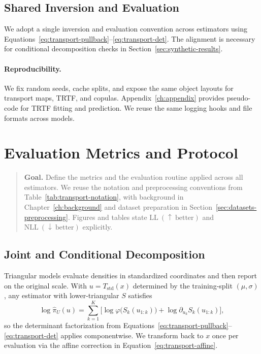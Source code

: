 \documentclass[11pt,a4paper,twoside]{book}\usepackage[]{graphicx}\usepackage[]{xcolor}
\begin{document}
\subsection{Shared Inversion and Evaluation}

We adopt a single inversion and evaluation convention across estimators using Equations~\eqref{eq:transport-pullback}--\eqref{eq:transport-det}. The alignment is necessary for conditional decomposition checks in Section~\ref{sec:synthetic-results}.

\paragraph{Reproducibility.} We fix random seeds, cache splits, and expose the same object layouts for transport maps, TRTF, and copulas. Appendix~\ref{ch:appendix} provides pseudo-code for TRTF fitting and prediction. We reuse the same logging hooks and file formats across models.
\section{Evaluation Metrics and Protocol}\label{sec:evaluation-protocol}


\begin{quote}
\textbf{Goal.} Define the metrics and the evaluation routine applied across all estimators. We reuse the notation and preprocessing conventions from Table~\ref{tab:transport-notation}, with background in Chapter~\ref{ch:background} and dataset preparation in Section~\ref{sec:datasets-preprocessing}. Figures and tables state $\text{LL}~(\uparrow~\text{better})$ and $\text{NLL}~(\downarrow~\text{better})$ explicitly.
\end{quote}

\subsection{Joint and Conditional Decomposition}

Triangular models evaluate densities in standardized coordinates and then report on the original scale. With $u = T_{\mathrm{std}}(x)$ determined by the training-split $(\mu, \sigma)$, any estimator with lower-triangular $S$ satisfies
\begin{equation}
 \log \hat{\pi}_U(u) = \sum_{k=1}^{K} \Big[ \log \varphi\big(S_k(u_{1:k})\big) + \log \partial_{u_k} S_k(u_{1:k}) \Big],
 \label{eq:evaluation-triangular}
\end{equation}
so the determinant factorization from Equations~\eqref{eq:transport-pullback}--\eqref{eq:transport-det} applies componentwise. We transform back to $x$ once per evaluation via the affine correction in Equation~\eqref{eq:transport-affine}.
\end{document}
